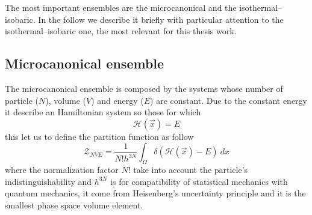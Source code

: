 The most important ensembles are the microcanonical and the isothermal--isobaric. In the follow we describe it briefly with particular attention to the isothermal--isobaric one, the most relevant for this thesis work.

\subsection{Microcanonical ensemble}
The microcanonical ensemble is composed by the systems whose number of particle ($N$), volume ($V$) and energy ($E$) are constant. Due to the constant energy it describe an Hamiltonian system so those for which
\begin{equation*}
	\mathcal{H}(\vec x) = E
\end{equation*}
this let us to define the partition function as follow
\begin{equation*}
	\mathcal{Z}_{NVE} = \frac{1}{N!h^{3N}}\int_\Omega \delta(\mathcal{H}(\vec x) - E)\ dx
\end{equation*}
where the normalization factor $N!$ take into account the particle's indistinguishability and $h^{3N}$ is for compatibility of statistical mechanics with quantum mechanics, it come from Heisenberg’s uncertainty principle and it is the smallest phase space volume element.

